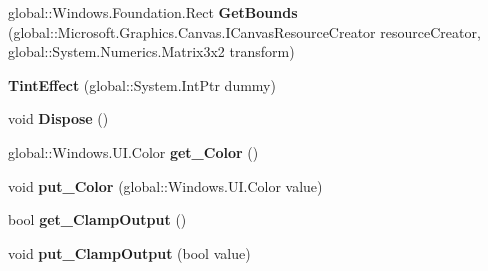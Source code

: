 \begin{DoxyCompactItemize}
\item 
\mbox{\label{class_microsoft_1_1_graphics_1_1_canvas_1_1_effects_1_1_tint_effect_a874cd7c0fda492b02303c38329523bb5}} 
global\+::\+Windows.\+Foundation.\+Rect {\bfseries Get\+Bounds} (global\+::\+Microsoft.\+Graphics.\+Canvas.\+I\+Canvas\+Resource\+Creator resource\+Creator, global\+::\+System.\+Numerics.\+Matrix3x2 transform)
\item 
\mbox{\label{class_microsoft_1_1_graphics_1_1_canvas_1_1_effects_1_1_tint_effect_ab6a7900d7383e34db9dae72dfca0b03c}} 
{\bfseries Tint\+Effect} (global\+::\+System.\+Int\+Ptr dummy)
\item 
\mbox{\label{class_microsoft_1_1_graphics_1_1_canvas_1_1_effects_1_1_tint_effect_ab057d395ffb4168e2e95ebdec2027f4f}} 
void {\bfseries Dispose} ()
\item 
\mbox{\label{class_microsoft_1_1_graphics_1_1_canvas_1_1_effects_1_1_tint_effect_a0286d78ccbae82990f13233219282806}} 
global\+::\+Windows.\+U\+I.\+Color {\bfseries get\+\_\+\+Color} ()
\item 
\mbox{\label{class_microsoft_1_1_graphics_1_1_canvas_1_1_effects_1_1_tint_effect_a080d65333257b075792ecc37d5b545c9}} 
void {\bfseries put\+\_\+\+Color} (global\+::\+Windows.\+U\+I.\+Color value)
\item 
\mbox{\label{class_microsoft_1_1_graphics_1_1_canvas_1_1_effects_1_1_tint_effect_a26fe14bbdea4256df42b059f96b801f2}} 
bool {\bfseries get\+\_\+\+Clamp\+Output} ()
\item 
\mbox{\label{class_microsoft_1_1_graphics_1_1_canvas_1_1_effects_1_1_tint_effect_a762a787f9d5c2379ffa4beb693095aa3}} 
void {\bfseries put\+\_\+\+Clamp\+Output} (bool value)
\item 
\mbox{\label{class_microsoft_1_1_graphics_1_1_canvas_1_1_effects_1_1_tint_effect_a891fdb54c303baa977b1404d8e95d6a6}} 

\end{DoxyCompactItemize}
